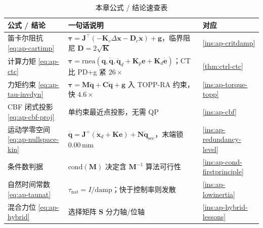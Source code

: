 \begin{table}[H]\centering\small
\caption{本章公式 / 结论速查表}
\begin{tabular}{p{} p{} p{}}
\toprule
公式 / 结论 & 一句话说明 & 对应 \\
\midrule
笛卡尔阻抗 \cref{eq:ap-cartimp} & $\boldsymbol{\tau}=\mathbf{J}^\top(-\mathbf{K}_c\Delta\mathbf{x}-\mathbf{D}_c\dot{\mathbf{x}})+\mathbf{g}$，临界阻尼 $\mathbf{D}=2\sqrt{\mathbf{K}}$ & \cref{ins:ap-critdamp} \\
计算力矩 \cref{eq:ap-ctc} & $\boldsymbol{\tau}=\mathrm{rnea}(\mathbf{q},\dot{\mathbf{q}},\ddot{\mathbf{q}}_d+\mathbf{K}_p\mathbf{e}+\mathbf{K}_d\dot{\mathbf{e}})$；CT 比 PD+g 紧 $26\times$ & \cref{thm:ctrl-ctc} \\
力矩约束 \cref{eq:ap-tau-invdyn} & $\boldsymbol{\tau}=\mathbf{M}\ddot{\mathbf{q}}+\mathbf{C}\dot{\mathbf{q}}+\mathbf{g}$ 入 TOPP-RA 约束，快 $4.6\times$ & \cref{ins:ap-torque-topp} \\
CBF 闭式投影 \cref{eq:ap-cbf-proj} & 单约束最近点投影，无需 QP & \cref{ins:ap-cbf} \\
运动学零空间 \cref{eq:ap-nullspace-kin} & $\dot{\mathbf{q}}=\mathbf{J}^{+}(\dot{\mathbf{x}}_d+\mathbf{K}\mathbf{e})+\mathbf{N}\dot{\mathbf{q}}_{\mathrm{sec}}$，末端锁 $0.00\,\mathrm{mm}$ & \cref{ins:ap-redundancy-level} \\
条件数判据 & $\mathrm{cond}(\mathbf{M})$ 决定含 $\mathbf{M}^{-1}$ 算法可行性 & \cref{ins:ap-cond-firstprinciple} \\
自然时间常数 \cref{eq:ap-taunat} & $\tau_{\mathrm{nat}}=I/\text{damp}$；快于控制率则发散 & \cref{ins:ap-lowinertia} \\
混合力位 \cref{eq:ap-hybrid} & 选择矩阵 $\mathbf{S}$ 分力轴/位轴 & \cref{ins:ap-hybrid-lessons} \\
\bottomrule
\end{tabular}
\end{table}

